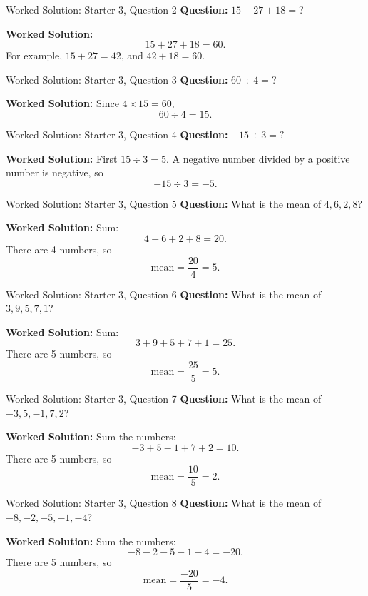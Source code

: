 \documentclass{beamer}
\begin{document}
\begin{frame}{Worked Solution: Starter 3, Question 2}
\textbf{Question:} \(15 + 27 + 18 = ?\)

\textbf{Worked Solution:}
\[
15 + 27 + 18 = 60.
\]
For example, \(15 + 27 = 42\), and \(42 + 18 = 60\).
\end{frame}

\begin{frame}{Worked Solution: Starter 3, Question 3}
\textbf{Question:} \(60 \div 4 = ?\)

\textbf{Worked Solution:}
Since \(4 \times 15 = 60\),
\[
60 \div 4 = 15.
\]
\end{frame}

\begin{frame}{Worked Solution: Starter 3, Question 4}
\textbf{Question:} \(-15 \div 3 = ?\)

\textbf{Worked Solution:}
First \(15 \div 3 = 5\).
A negative number divided by a positive number is negative, so
\[
-15 \div 3 = -5.
\]
\end{frame}

\begin{frame}{Worked Solution: Starter 3, Question 5}
\textbf{Question:} What is the mean of \(4, 6, 2, 8\)?

\textbf{Worked Solution:}
Sum:
\[
4 + 6 + 2 + 8 = 20.
\]
There are 4 numbers, so
\[
\text{mean} = \frac{20}{4} = 5.
\]
\end{frame}

\begin{frame}{Worked Solution: Starter 3, Question 6}
\textbf{Question:} What is the mean of \(3, 9, 5, 7, 1\)?

\textbf{Worked Solution:}
Sum:
\[
3 + 9 + 5 + 7 + 1 = 25.
\]
There are 5 numbers, so
\[
\text{mean} = \frac{25}{5} = 5.
\]
\end{frame}

\begin{frame}{Worked Solution: Starter 3, Question 7}
\textbf{Question:} What is the mean of \(-3, 5, -1, 7, 2\)?

\textbf{Worked Solution:}
Sum the numbers:
\[
-3 + 5 - 1 + 7 + 2 = 10.
\]
There are 5 numbers, so
\[
\text{mean} = \frac{10}{5} = 2.
\]
\end{frame}

\begin{frame}{Worked Solution: Starter 3, Question 8}
\textbf{Question:} What is the mean of \(-8, -2, -5, -1, -4\)?

\textbf{Worked Solution:}
Sum the numbers:
\[
-8 - 2 - 5 - 1 - 4 = -20.
\]
There are 5 numbers, so
\[
\text{mean} = \frac{-20}{5} = -4.
\]
\end{frame}
\end{document}
